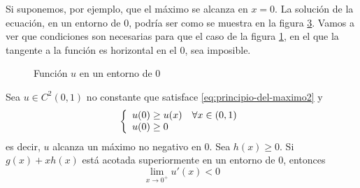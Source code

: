 Si suponemos, por ejemplo, que el máximo se alcanza en $x=0$. La solución de la ecuación, en un entorno de $0$, podría ser como se muestra en la figura \ref{fig:sol-entorno-cero}. Vamos a ver que condiciones son necesarias para que el caso de la figura \ref{fig:sol-entorno-cero-a}, en el que la tangente a la función es horizontal en el $0$, sea imposible.

\begin{figure}[ht]
\centering
\begin{subfigure}{.5\textwidth}
	\centering
	\caption{}
	\label{fig:sol-entorno-cero-a}
\end{subfigure}%
\begin{subfigure}{.5\textwidth}
	\centering
	\caption{}
	\label{fig:sol-entorno-cero-b}
\end{subfigure}%

\caption{Función $u$ en un entorno de $0$}
\label{fig:sol-entorno-cero}
\end{figure}

\newpage
\begin{theorem}\label{theorem2}
Sea $u\in C^2(0,1)$ no constante que satisface \eqref{eq:principio-del-maximo2} y 
\begin{equation*}
\left\{
\begin{array}{l l}
u(0) \ge u(x) & \forall x \in (0,1)\\
u(0) \ge 0
\end{array}
\right.
\end{equation*}
es decir, $u$ alcanza un máximo no negativo en $0$.
Sea $h(x) \ge 0$.
Si $g(x) + xh(x)$ está acotada superiormente en un entorno de $0$, entonces
$$\lim_{x\to0^+}u'(x) < 0$$
\end{theorem}

